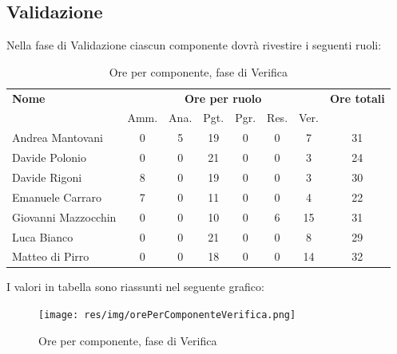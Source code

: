     
    
\pagebreak
\subsection{Validazione}
Nella fase di Validazione ciascun componente dovrà rivestire i seguenti ruoli:

\begin{table}[H]
\begin{tabular}{lccccccc}
\toprule
    \textbf{Nome}  & \multicolumn{6}{c}{\textbf{Ore per ruolo}} & \textbf{Ore totali} \\
     & Amm. & Ana. & Pgt. & Pgr. & Res. & Ver. & \\
    \midrule
    
	   Andrea Mantovani & 0 & 5 & 19 & 0 & 0 & 7 & 31 \\
         Davide Polonio & 0 & 0 & 21 & 0 & 0 & 3 & 24 \\
       	  Davide Rigoni & 8 & 0 & 19 & 0 & 0 & 3 & 30 \\
	   Emanuele Carraro & 7 & 0 & 11 & 0 & 0 & 4 & 22 \\
	Giovanni Mazzocchin & 0 & 0 & 10 & 0 & 6 & 15 & 31 \\
	        Luca Bianco & 0 & 0 & 21 & 0 & 0 & 8 & 29 \\
      	Matteo di Pirro & 0 & 0 & 18 & 0 & 0 & 14 & 32 \\
    
    \bottomrule
\end{tabular}
\caption{Ore per componente, fase di Verifica}
\end{table}

I valori in tabella sono riassunti nel seguente grafico: \\ 

    \begin{figure}[H]
      \begin{center}
        \texttt{[image: res/img/orePerComponenteVerifica.png]}
      \caption{Ore per componente, fase di Verifica}
      \end{center} 
    \end{figure}    
   
    
    
